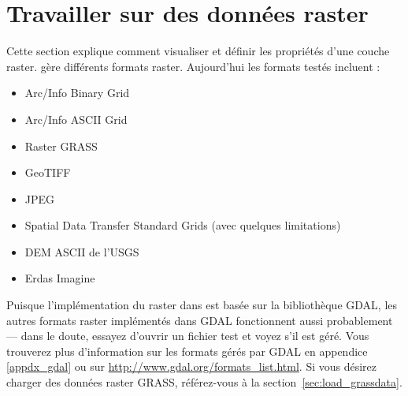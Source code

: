 \chapter{Travailler sur des données raster}\label{label_raster}


Cette section explique comment visualiser et définir les propriétés d'une couche raster. \qg gère différents formats raster. Aujourd'hui les formats testés
incluent :
\begin{itemize}[label=--]
\item Arc/Info Binary Grid
\item Arc/Info ASCII Grid
\item Raster GRASS
\item GeoTIFF
\item JPEG
\item Spatial Data Transfer Standard Grids (avec quelques limitations)
\item DEM ASCII de l'USGS
\item Erdas Imagine
\end{itemize}

Puisque l'implémentation du raster dans \qg est basée sur la bibliothèque
GDAL, les autres formats raster implémentés dans GDAL fonctionnent aussi
probablement — dans le doute, essayez d'ouvrir un fichier test et voyez s'il est
géré. Vous trouverez plus d'information sur les formats gérés par GDAL  en
appendice \ref{appdx_gdal}  ou sur
\url{http://www.gdal.org/formats_list.html}. Si vous désirez charger des
données raster GRASS, référez-vous à la section~\ref{sec:load_grassdata}.

